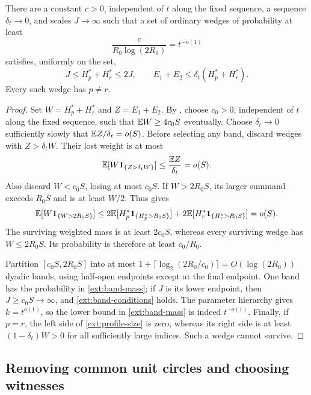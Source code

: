\begin{lemma}\label{ext:band}
There are a constant \(c>0\), independent of \(t\) along the fixed
sequence, a sequence \(\delta_t\to0\), and scales \(J\to\infty\) such
that a set of ordinary wedges of probability at least
\begin{equation}\label{ext:band-mass}
 \frac{c}{R_0\log(2R_0)}=t^{-o(1)}
\end{equation}
satisfies, uniformly on the set,
\begin{equation}\label{ext:band-conditions}
 J\le H_p^*+H_r^*\le2J,\qquad
 E_1+E_2\le\delta_t(H_p^*+H_r^*).
\end{equation}
Every such wedge has \(p\ne r\).
\end{lemma}

\begin{proof}
Set \(W=H_p^*+H_r^*\) and \(Z=E_1+E_2\).  By
, choose \(c_0>0\), independent of \(t\) along
the fixed sequence, such that \(\mathbb E W\ge4c_0S\) eventually.
Choose \(\delta_t\to0\) sufficiently
slowly that \(\mathbb E Z/\delta_t=o(S)\).  Before selecting any band, discard
wedges with \(Z>\delta_tW\).  Their lost weight is at most
\[
 \mathbb E[W\mathbf1_{\{Z>\delta_tW\}}]\le\frac{\mathbb E Z}{\delta_t}=o(S).
\]
Also discard \(W<c_0S\), losing at most \(c_0S\).
If \(W>2R_0S\), its larger summand exceeds \(R_0S\) and is at least
\(W/2\).  Thus  gives
\[
 \mathbb E[W\mathbf1_{\{W>2R_0S\}}]
 \le2\mathbb E[H_p^*\mathbf1_{\{H_p^*>R_0S\}}]
    +2\mathbb E[H_r^*\mathbf1_{\{H_r^*>R_0S\}}]=o(S).
\]
The surviving weighted mass is at least \(2c_0S\), whereas every
surviving wedge has \(W\le2R_0S\).  Its probability is therefore at
least \(c_0/R_0\).

Partition \([c_0S,2R_0S]\) into at most
\(1+\lceil\log_2(2R_0/c_0)\rceil=O(\log(2R_0))\) dyadic bands,
using half-open endpoints except at the final endpoint.  One band has
the probability in \eqref{ext:band-mass}; if \(J\) is its lower endpoint,
then \(J\ge c_0S\to\infty\), and \eqref{ext:band-conditions} holds.
The parameter hierarchy gives \(k=t^{o(1)}\), so the lower bound in
\eqref{ext:band-mass} is indeed \(t^{-o(1)}\).
Finally, if \(p=r\), the left side of \eqref{ext:profile-size} is zero,
whereas its right side is at least \((1-\delta_t)W>0\) for all
sufficiently large indices.  Such a wedge cannot survive.
\end{proof}

\subsection{Removing common unit circles and choosing witnesses}

